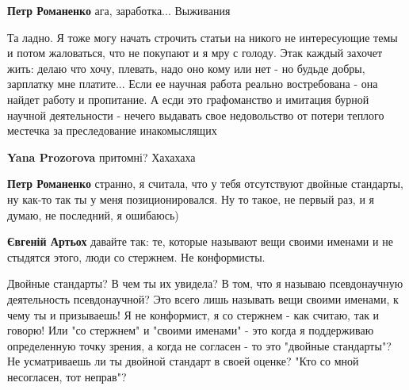 \begin{itemize}
\begin{itemize}
\textbf{Петр Романенко} ага, заработка... Выживания

 

Та ладно. Я тоже могу начать строчить статьи на никого не интересующие темы и
потом жаловаться, что не покупают и я мру с голоду. Этак каждый захочет жить:
делаю что хочу, плевать, надо оно кому или нет - но будьде добры, зарплатку мне
платите... Если ее научная работа реально востребована - она найдет работу и
пропитание. А есди это графоманство и имитация бурной научной деятельности -
нечего выдавать свое недовольство от потери теплого местечка за преследование
инакомыслящих


 
\textbf{Yana Prozorova} притомні? Хахахаха

 
\textbf{Петр Романенко} странно, я считала, что у тебя отсутствуют двойные стандарты, ну как-то так ты у меня позиционировался. Ну то такое, не первый раз, и я думаю, не последний, я ошибаюсь)

 
\textbf{Євгеній Артьох} давайте так: те, которые называют вещи своими именами и не стыдятся этого, люди со стержнем. Не конформисты.

 

Двойные стандарты? В чем ты их увидела? В том, что я называю псевдонаучную
деятельность псевдонаучной? Это всего лишь называть вещи своими именами, к чему
ты и призываешь! Я не конформист, я со стержнем - как считаю, так и говорю! Или
"со стержнем" и "своими именами" - это когда я поддерживаю определенную точку
зрения, а когда не согласен - то это "двойные стандарты"? Не усматриваешь ли ты
двойной стандарт в своей оценке? "Кто со мной несогласен, тот неправ"?


\end{itemize}
\end{itemize}
